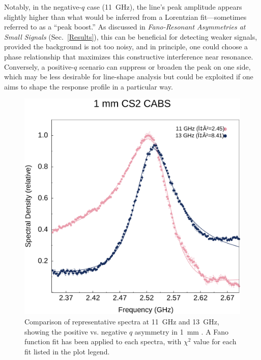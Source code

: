 Notably, in the negative-\(q\) case (\SI{11}{\giga\hertz}), the line’s peak amplitude appears slightly higher than what would be inferred from a Lorentzian fit—sometimes referred to as a “peak boost.” As discussed in \textit{Fano-Resonant Asymmetries at Small Signals} (Sec.~\ref{Results}), this can be beneficial for detecting weaker signals, provided the background is not too noisy, and in principle, one could choose a phase relationship that maximizes this constructive interference near resonance. Conversely, a positive-\(q\) scenario can suppress or broaden the peak on one side, which may be less desirable for line-shape analysis but could be exploited if one aims to shape the response profile in a particular way.

\begin{figure}[ht]
  \centering
  \includegraphics[width=\textwidth]{figs/4-CABS/CS2FanoCompare.pdf}
  \caption{Comparison of representative spectra at \SI{11}{\giga\hertz} and \SI{13}{\giga\hertz}, showing the positive vs. negative \(q\) asymmetry in \SI{1}{\milli\meter} . A Fano function fit has been applied to each spectra, with \(\chi^{2}\) value for each fit listed in the plot legend.}
  \label{fig:CS2FanoCompare}
\end{figure}


